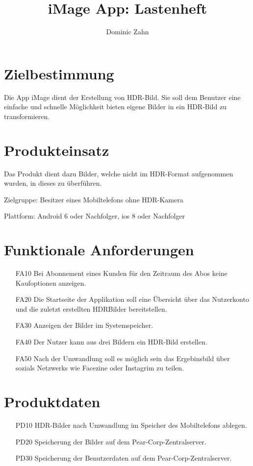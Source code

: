 \documentclass[parskip=full]{scrartcl}
\title{iMage App: Lastenheft}
\author{Dominic Zahn}
\begin{document}
\maketitle

\section{Zielbestimmung}
Die \gls{App} iMage dient der Erstellung von \gls{HDR-Bild}. Sie soll dem Benutzer eine einfache und
schnelle Möglichkeit bieten eigene Bilder in ein \gls{HDR-Bild} zu transformieren.

\section{Produkteinsatz}
Das Produkt dient dazu Bilder, welche nicht im HDR-Format aufgenommen wurden, in dieses zu überführen.

Zielgruppe: Besitzer eines Mobiltelefons ohne HDR-Kamera

Plattform: Android 6 oder Nachfolger, ios 8 oder Nachfolger

\section{Funktionale Anforderungen}
\begin{itemize}[nosep]

\item[FA10] Bei Abonnement eines Kunden für den Zeitraum des Abos keine Kaufoptionen anzeigen.
\item[FA20] Die Startseite der Applikation soll eine Übersicht über das Nutzerkonto und die zuletzt erstellten HDRBilder
bereitstellen.
\item[FA30] Anzeigen der Bilder im \gls{Systemspeicher}.
\item[FA40] Der Nutzer kann aus drei Bildern ein \gls{HDR-Bild} erstellen.
\item[FA50] Nach der Umwandlung soll es möglich sein das Ergebinsbild über \glspl{sozials Netzwerk} wie Facezine oder Instagrim
zu teilen.

\end{itemize}

\section{Produktdaten}
\begin{itemize}[nosep]
\item[PD10] HDR-Bilder nach Umwandlung im Speicher des Mobiltelefons ablegen.
\item[PD20] Speicherung der Bilder auf dem Pear-Corp-Zentralserver.
\item[PD30] Speicherung der Benutzerdaten auf dem Pear-Corp-Zentralserver.
    
\end{itemize}
\end{document}
